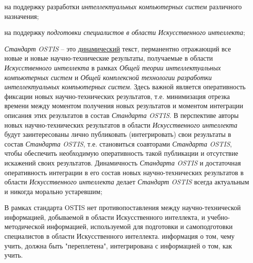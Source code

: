 \begin{SCn}
{\begin{scnitemize}
\begin{scnitemizeii}
			\item на поддержку разработки \textit{интеллектуальных компьютерных систем} различного назначения;
			\item на поддержку \textit{подготовки специалистов в области Искусственного интеллекта};
		\end{scnitemizeii}
		\item \textit{Стандарт OSTIS} -- это \uline{динамический} текст, перманентно отражающий все новые и новые научно-технические результаты, получаемые в области \textit{Искусственного интеллекта} в рамках \textit{Общей теории интеллектуальных компьютерных систем} и \textit{Общей комплексной технологии разработки интеллектуальных компьютерных систем}. Здесь важной является оперативность фиксации новых научно-технических результатов, т.е. минимизация отрезка времени между моментом получения новых результатов и моментом интеграции описания этих результатов в состав \textit{Стандарта OSTIS}. В перспективе авторы новых научно-технических результатов в области \textit{Искусственного интеллекта} будут заинтересованы лично публиковать (интегрировать) свои результаты в состав \textit{Стандарта OSTIS}, т.е. становиться соавторами \textit{Стандарта OSTIS}, чтобы обеспечить необходимую оперативность такой публикации и отсутствие искажений своих результатов. Динамичность \textit{Стандарта OSTIS} и достаточная оперативность интеграции в его состав новых научно-технических результатов в области \textit{Искусственного интеллекта} делает \textit{Стандарт OSTIS} всегда актуальным и никогда морально устаревшим;
		\item В рамках стандарта OSTIS нет противопоставления между научно-технической информацией, добываемой в области Искусственного интеллекта, и учебно-методической информацией, используемой для подготовки и самоподготовки специалистов в области Искусственного интеллекта. информация о том, чему учить, должна быть "переплетена"{}, интегрирована с информацией о том, как учить.
	\end{scnitemize}
}




\end{SCn}
